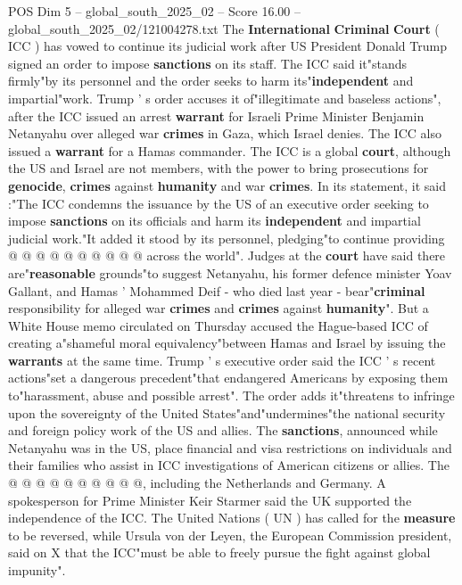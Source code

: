 \begin{textsample}{POS Dim 5 – global\_south\_2025\_02 – Score 16.00 – global\_south\_2025\_02/121004278.txt}  \label{ex:f5_pos_149}
The \textbf{International} \textbf{Criminal} \textbf{Court} ( ICC ) has vowed to continue its judicial work after US President Donald Trump signed an order to impose \textbf{sanctions} on its staff.
The ICC said it"stands firmly"by its personnel and the order seeks to harm its"\textbf{independent} and impartial"work.
Trump ' s order accuses it of"illegitimate and baseless actions", after the ICC issued an arrest \textbf{warrant} for Israeli Prime Minister Benjamin Netanyahu over alleged war \textbf{crimes} in Gaza, which Israel denies.
The ICC also issued a \textbf{warrant} for a Hamas commander.
The ICC is a global \textbf{court}, although the US and Israel are not members, with the power to bring prosecutions for \textbf{genocide}, \textbf{crimes} against \textbf{humanity} and war \textbf{crimes}.
In its statement, it said :"The ICC condemns the issuance by the US of an executive order seeking to impose \textbf{sanctions} on its officials and harm its \textbf{independent} and impartial judicial work."It added it stood by its personnel, pledging"to continue providing @ @ @ @ @ @ @ @ @ @ across the world".
Judges at the \textbf{court} have said there are"\textbf{reasonable} grounds"to suggest Netanyahu, his former defence minister Yoav Gallant, and Hamas ' Mohammed Deif - who died last year - bear"\textbf{criminal} responsibility for alleged war \textbf{crimes} and \textbf{crimes} against \textbf{humanity}".
But a White House memo circulated on Thursday accused the Hague-based ICC of creating a"shameful moral equivalency"between Hamas and Israel by issuing the \textbf{warrants} at the same time.
Trump ' s executive order said the ICC ' s recent actions"set a dangerous precedent"that endangered Americans by exposing them to"harassment, abuse and possible arrest".
The order adds it"threatens to infringe upon the sovereignty of the United States"and"undermines"the national security and foreign policy work of the US and allies.
The \textbf{sanctions}, announced while Netanyahu was in the US, place financial and visa restrictions on individuals and their families who assist in ICC investigations of American citizens or allies.
The @ @ @ @ @ @ @ @ @ @, including the Netherlands and Germany.
A spokesperson for Prime Minister Keir Starmer said the UK supported the independence of the ICC.
The United Nations ( UN ) has called for the \textbf{measure} to be reversed, while Ursula von der Leyen, the European Commission president, said on X that the ICC"must be able to freely pursue the fight against global impunity".

\end{textsample}
